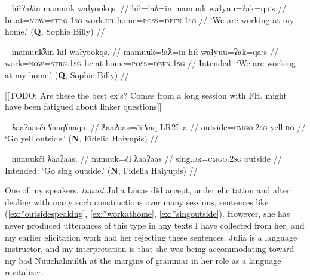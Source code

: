 \ex~ \label{ex:workathome}
\begingl
\glpreamble hiłʔaƛin mamuuk wałyookqs. //
\gla hił=!aƛ=in mamuuk wałyuu=ʔak=qaˑs  //
\glb be.at=\textsc{now}=\textsc{strg.1sg} work.\textsc{dr} home=\textsc{poss}=\textsc{defn.1sg} //
\glft `We are working at my home.' (\textbf{Q}, Sophie Billy) //
\endgl
\xe

\ex~ \label{ex:*workathome}
\begingl
\glpreamble *mamuuk̓ƛin hił wałyookqs. //
\gla mamuuk=!aƛ=in hił wałyuu=ʔak=qaˑs  //
\glb work=\textsc{now}=\textsc{strg.1sg} be.at home=\textsc{poss}=\textsc{defn.1sg} //
\glft Intended: `We are working at my home.' (\textbf{Q}, Sophie Billy) //
\endgl
\xe

[[TODO: Are these the best ex's? Comes from a long session with FH, might have been fatigued about linker questions]]

\ex~ \label{ex:shoutoutside}
\begingl
\glpreamble ƛ̓aaʔaasči ʕaaqʕaaqa. //
\gla ƛ̓aaʔaas=či ʕaq-LR2L.a  //
\glb outside=\textsc{cmgo.2sg} yell-\textsc{ro} //
\glft `Go yell outside.' (\textbf{N}, Fidelia Haiyupis) //
\endgl
\xe

\ex~ \label{ex:*singoutside}
\begingl
\glpreamble *nunuukči ƛaaʔaas. //
\gla nunuuk=či ƛaaʔaas  //
\glb sing.\textsc{dr}=\textsc{cmgo.2sg} outside //
\glft Intended: `Go sing outside.'\footnotemark{} (\textbf{N}, Fidelia Haiyupis) //
\endgl
\xe



One of my speakers, \textit{tupaat} Julia Lucas did accept, under elicitation and after dealing with many such constructions over many sessions, sentences like (\ref{ex:*outsidespeaking}, \ref{ex:*workathome}, \ref{ex:*singoutside}). However, she has never produced utterances of this type in any texts I have collected from her, and my earlier elicitation work had her rejecting these sentences. Julia is a language instructor, and my interpretation is that she was being accommodating toward my bad Nuuchahnulth at the margins of grammar in her role as a language revitalizer.


